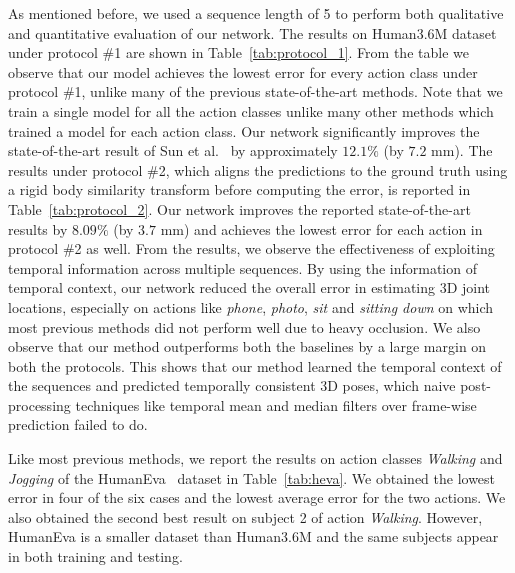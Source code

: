 \documentclass[runningheads]{llncs}
\begin{document}
As mentioned before, we used a sequence length of 5 to perform both qualitative and quantitative evaluation of our network. The results on Human3.6M dataset~\cite{h36m_pami} under protocol \#1 are shown in Table~\ref{tab:protocol_1}. From the table we observe that our model achieves the lowest error for every action class under protocol \#1, unlike many of the previous state-of-the-art methods. Note that we train a single model for all the action classes unlike many other methods which trained a model for each action class.  Our network significantly improves the state-of-the-art result of Sun et al.~\cite{sun2017compositional} by approximately $12.1\%$ (by $7.2$ mm). The results under  protocol \#2, which aligns the predictions to the ground truth using a rigid body similarity transform before computing the error, is reported in Table~\ref{tab:protocol_2}. Our network improves the reported state-of-the-art results by $8.09\%$ (by $3.7$ mm) and achieves the lowest error for each action in protocol \#2  as well. From the results, we observe the effectiveness of exploiting temporal information across multiple sequences. By using the information of temporal context, our network reduced the overall error in estimating 3D joint locations, especially on actions like  \emph{phone},  \emph{photo}, \emph{sit} and \emph{sitting down} on which most previous methods did not perform well due to heavy occlusion. We also observe that our method outperforms both the baselines by a large margin on both the protocols. This shows that our method learned the temporal context of the sequences and predicted temporally consistent 3D poses, which naive post-processing techniques like temporal mean and median filters over frame-wise prediction failed to do. 

Like most previous methods, we report the results on action classes \emph{Walking} and \emph{Jogging} of the HumanEva~\cite{heva} dataset in Table~\ref{tab:heva}. We obtained the lowest error in four of the six cases and the lowest average error for the two actions. We also obtained the second best result on subject 2 of action \emph{Walking}. However, HumanEva is a smaller dataset than Human3.6M and the same subjects appear in both training and testing.
\end{document}
